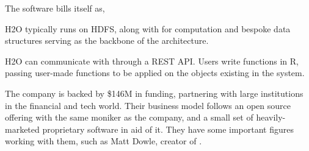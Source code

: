The  software bills itself as,


H2O typically runs on HDFS, along with  for computation and bespoke data structures serving as the backbone of the architecture.

H2O can communicate with \R{} through a REST API.
Users write functions in R, passing user-made functions to be applied on the objects existing in the  system\cite{h2o.ai:_h2o}.

The company  is backed by \$146M in funding, partnering with large institutions in the financial and tech world.
Their business model follows an open source offering with the same moniker as the company, and a small set of heavily-marketed proprietary software in aid of it.
They have some important figures working with them, such as Matt Dowle, creator of .
